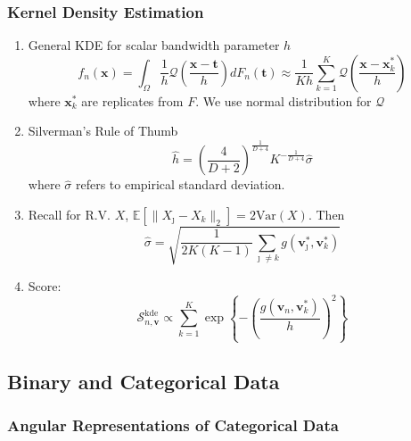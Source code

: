 \documentclass[aspectratio=169,10pt]{beamer}
\begin{document}
\begin{frame}
    \frametitle{Kernel Density Estimation}
    {\footnotesize
    \begin{enumerate}
        \item General KDE for scalar bandwidth parameter $h$
        \[
        f_n(\bm{x}) = \int_{\Omega}\frac{1}{h}\mathcal{Q}\left(\frac{\bm{x} 
                - \bm{t}}{h}\right)dF_n(\bm{t})
            \approx \frac{1}{Kh}\sum_{k = 1}^K\mathcal{Q}\left(\frac{\bm{x} 
                - \bm{x}_k^*}{h}\right)
        \]
        where $\bm{x}_k^*$ are replicates from $F$.  We use normal distribution 
            for $\mathcal{Q}$
        \item Silverman's Rule of Thumb
        \[
            \hat{h} = \left(\frac{4}{D + 2}\right)^{
                \frac{1}{D + 4}}K^{-\frac{1}{D+4}}
                \hat{\sigma}
        \]
        where $\hat{\sigma}$ refers to empirical standard deviation.
        \item Recall for R.V. $X$, 
            $\mathbb{E}\left[\lVert X_{\jmath} - X_k\rVert_2\right] = 2\text{Var}(X)$.  
            Then
        \[
            \hat{\sigma} = 
                \sqrt{\frac{1}{2K(K-1)}\sum_{\jmath \neq k}
                    g\left(\bm{v}_{\jmath}^*,\bm{v}_k^*\right)}
        \]
        \item Score:
        \[
        \mathcal{S}_{n,\bm{v}}^{\text{kde}} \propto 
            \sum_{k=1}^K\exp\left\lbrace-\left(
                \frac{g(\bm{v}_n,\bm{v}_k^*)}{h}\right)^2\right\rbrace
        \]
    \end{enumerate}
    }
\end{frame} %

\subsection{Binary and Categorical Data}

\subsubsection{Angular Representations of Categorical Data}
\end{document}
